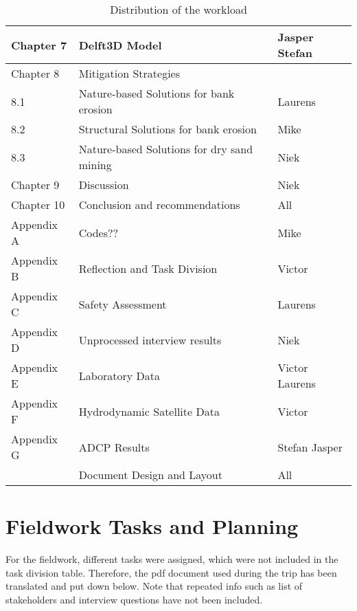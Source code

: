 \begin{table}[htb]
    \setlength\extrarowheight{4pt}
    \centering
    \caption{Distribution of the workload}
    \label{tab:taskdivision2}
    \begin{tabularx}{\textwidth}{lXX}
        \toprule
                Chapter 7 & Delft3D Model & Jasper Stefan\\
        \midrule
        Chapter 8 & Mitigation Strategies & \\
        8.1 & Nature-based Solutions for bank erosion & Laurens \\
        8.2 & Structural Solutions for bank erosion & Mike \\
        8.3 & Nature-based Solutions for dry sand mining & Niek \\
        \midrule
        Chapter 9 & Discussion & Niek \\
        \midrule
        Chapter 10 & Conclusion and recommendations & All \\
        \midrule
        Appendix A & Codes?? & Mike \\
        Appendix B & Reflection and Task Division & Victor \\
        Appendix C & Safety Assessment & Laurens \\
        Appendix D & Unprocessed interview results & Niek \\
        Appendix E & Laboratory Data & Victor Laurens \\
        Appendix F & Hydrodynamic Satellite Data & Victor \\
        Appendix G & ADCP Results & Stefan Jasper\\
        \midrule
        & Document Design and Layout & All \\
        \bottomrule
    \end{tabularx}
\end{table}

\section{Fieldwork Tasks and Planning}

For the fieldwork, different tasks were assigned, which were not included in the task division table. 
Therefore, the pdf document used during the trip has been translated and put down below.
Note that repeated info such as list of stakeholders and interview questions have not been included.


